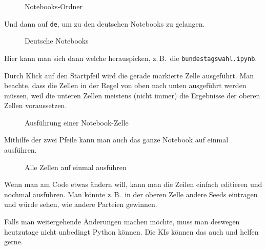 \begin{figure}[h]
  \centering
  \caption{Notebooks-Ordner}
\end{figure}

Und dann auf \texttt{de}, um zu den deutschen Notebooks zu gelangen.

\begin{figure}[h]
  \centering
  \caption{Deutsche Notebooks}
\end{figure}

Hier kann man sich dann welche herauspicken, z.\,B.\ die \texttt{bundestagswahl.ipynb}.

Durch Klick auf den Startpfeil wird die gerade markierte Zelle ausgeführt. Man beachte, dass die
Zellen in der Regel von oben nach unten ausgeführt werden müssen, weil die unteren Zellen
meistens (nicht immer) die Ergebnisse der oberen Zellen voraussetzen.

\begin{figure}[h]
  \centering
  \caption{Ausführung einer Notebook-Zelle}
\end{figure}

Mithilfe der zwei Pfeile kann man auch das ganze Notebook auf einmal ausführen.

\begin{figure}[h]
  \centering
  \caption{Alle Zellen auf einmal ausführen}
\end{figure}

Wenn man am Code etwas ändern will, kann man die Zeilen einfach editieren und nochmal ausführen.
Man könnte z.\,B.\ in der oberen Zelle andere Seeds eintragen und würde sehen, wie andere Parteien
gewinnen.

Falls man weitergehende Änderungen machen möchte, muss man deswegen heutzutage nicht unbedingt
Python können. Die KIs können das auch und helfen gerne.
